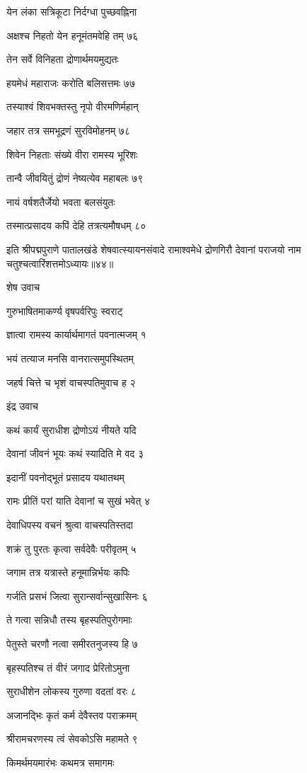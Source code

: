 येन लंका सत्रिकूटा निर्दग्धा पुच्छवह्निना

अक्षश्च निहतो येन हनूमंतमवेहि तम् ७६

तेन सर्वे विनिहता द्रोणार्थमयमुद्यतः

हयमेधं महाराजः करोति बलिसत्तमः ७७

तस्याश्वं शिवभक्तस्तु नृपो वीरमणिर्महान्

जहार तत्र समभूद्रणं सुरविमोहनम् ७८

शिवेन निहताः संख्ये वीरा रामस्य भूरिशः

तान्वै जीवयितुं द्रोणं नेष्यत्येव महाबलः ७९

नायं वर्षशतैर्जेयो भवता बलसंयुतः

तस्मात्प्रसादय कपिं देहि तत्रत्यमौषधम् ८०

इति श्रीपद्मपुराणे पातालखंडे शेषवात्स्यायनसंवादे रामाश्वमेधे द्रोणगिरौ देवानां पराजयो नाम चतुश्चत्वारिंशत्तमोऽध्यायः॥४४॥


शेष उवाच

गुरुभाषितमाकर्ण्य वृषपर्वरिपुः स्वराट्

ज्ञात्वा रामस्य कार्यार्थमागतं पवनात्मजम् १

भयं तत्याज मनसि वानरात्समुपस्थितम्

जहर्ष चित्ते च भृशं वाचस्पतिमुवाच ह २

इंद्र उवाच

कथं कार्यं सुराधीश द्रोणोऽयं नीयते यदि

देवानां जीवनं भूयः कथं स्यादिति मे वद ३

इदानीं पवनोद्भूतं प्रसादय यथातथम्

रामः प्रीतिं परां याति देवानां च सुखं भवेत् ४

देवाधिपस्य वचनं श्रुत्वा वाचस्पतिस्तदा

शक्रं तु पुरतः कृत्वा सर्वदेवैः परीवृतम् ५

जगाम तत्र यत्रास्ते हनूमान्निर्भयः कपिः

गर्जति प्रसभं जित्वा सुरान्सर्वान्सुखासिनः ६

ते गत्वा सन्निधौ तस्य बृहस्पतिपुरोगमाः

पेतुस्ते चरणौ नत्वा समीरतनुजस्य हि ७

बृहस्पतिश्च तं वीरं जगाद प्रेरितोऽमुना

सुराधीशेन लोकस्य गुरुणा वदतां वरः ८

अजानद्भिः कृतं कर्म देवैस्तव पराक्रमम्

श्रीरामचरणस्य त्वं सेवकोऽसि महामते ९

किमर्थमयमारंभः कथमत्र समागमः

